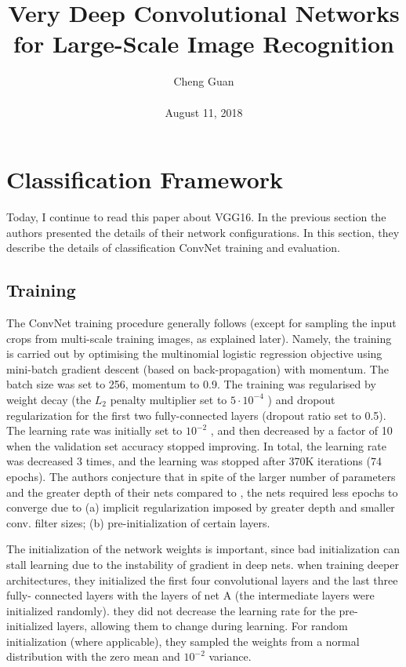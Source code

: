 \documentclass[10pt,twocolumn,letterpaper]{article}
\title{Very Deep Convolutional Networks for Large-Scale Image Recognition}
\author{Cheng Guan\\\\
August 11, 2018}
\begin{document}
\maketitle
\section{Classification Framework}
Today, I continue to read this paper about VGG16. In the previous section the authors presented the details of their network configurations. In this section, they
describe the details of classification ConvNet training and evaluation.
\subsection{Training}
The ConvNet training procedure generally follows \cite{krizhevsky2012imagenet} (except for sampling
the input crops from multi-scale training images, as explained later). Namely, the training is carried
out by optimising the multinomial logistic regression objective using mini-batch gradient descent
(based on back-propagation\cite{lecun1989backpropagation}) with momentum. The batch size was set to 256,
momentum to 0.9. The training was regularised by weight decay (the $L_2$ penalty multiplier set to
$5\cdot10^{-4}$ ) and dropout regularization for the first two fully-connected layers (dropout ratio set to 0.5).
The learning rate was initially set to $10^{-2}$ , and then decreased by a factor of 10 when the validation
set accuracy stopped improving. In total, the learning rate was decreased 3 times, and the learning
was stopped after 370K iterations (74 epochs). The authors conjecture that in spite of the larger number of
parameters and the greater depth of their nets compared to \cite{krizhevsky2012imagenet}, the nets required
less epochs to converge due to (a) implicit regularization imposed by greater depth and smaller conv.
filter sizes; (b) pre-initialization of certain layers.
\par
The initialization of the network weights is important, since bad initialization can stall learning due
to the instability of gradient in deep nets. when
training deeper architectures, they initialized the first four convolutional layers and the last three fully-
connected layers with the layers of net A (the intermediate layers were initialized randomly). they did
not decrease the learning rate for the pre-initialized layers, allowing them to change during learning.
For random initialization (where applicable), they sampled the weights from a normal distribution
with the zero mean and $10^{-2}$ variance.
\end{document}
